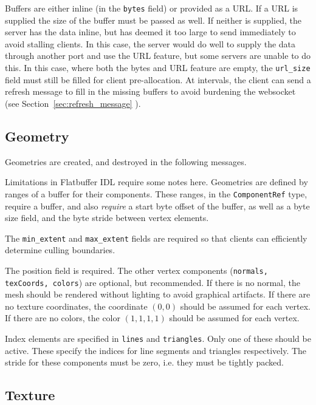 \documentclass[11pt, oneside]{amsart}
\begin{document}
Buffers are either inline (in the \texttt{bytes} field) or provided as a URL. If a URL is supplied the size of the buffer must be passed as well. If neither is supplied, the server has the data inline, but has deemed it too large to send immediately to avoid stalling clients. In this case, the server would do well to supply the data through another port and use the URL feature, but some servers are unable to do this. In this case, where both the bytes and URL feature are empty, the \texttt{url\_size} field must still be filled for client pre-allocation. At intervals, the client can send a refresh message to fill in the missing buffers to avoid burdening the websocket (see Section~\ref{sec:refresh_message} ).

\subsection{Geometry}

Geometries are created, and destroyed in the following messages.



Limitations in Flatbuffer IDL require some notes here. Geometries are defined by ranges of a buffer for their components. These ranges, in the \texttt{ComponentRef} type, require a buffer, and also \textit{require} a start byte offset of the buffer, as well as a byte size field, and the byte stride between vertex elements.

The \texttt{min\_extent} and \texttt{max\_extent} fields are required so that clients can efficiently determine culling boundaries.

The position field is required. The other vertex components (\texttt{normals, texCoords, colors}) are optional, but recommended. If there is no normal, the mesh should be rendered without lighting to avoid graphical artifacts. If there are no texture coordinates, the coordinate $(0,0)$ should be assumed for each vertex. If there are no colors, the color $(1,1,1,1)$ should be assumed for each vertex.

Index elements are specified in \texttt{lines} and \texttt{triangles}. Only one of these should be active. These specify the indices for line segments and triangles respectively. The stride for these components must be zero, i.e. they must be tightly packed.

\subsection{Texture}
\end{document}
